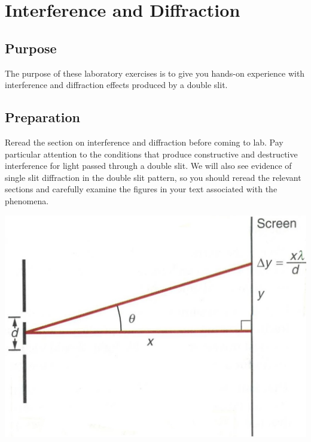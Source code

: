 \chapter{Interference and Diffraction}

\begin{multicols}{2}
\section{Purpose}  The purpose of these laboratory exercises is to give you hands-on experience with interference and diffraction effects produced by a double slit.
\section{Preparation}  Reread the section on interference and diffraction before coming to lab.  Pay particular attention to the conditions that produce constructive and destructive interference for light passed through a double slit.  We will also see evidence of single slit diffraction in the double slit pattern, so you should reread the relevant sections and carefully examine the figures in your text associated with the phenomena.



\begin{center}
	\includegraphics[scale=0.8]{5bgraf/fig_18}
	\label{f:fig18}
\end{center}


\end{multicols}
